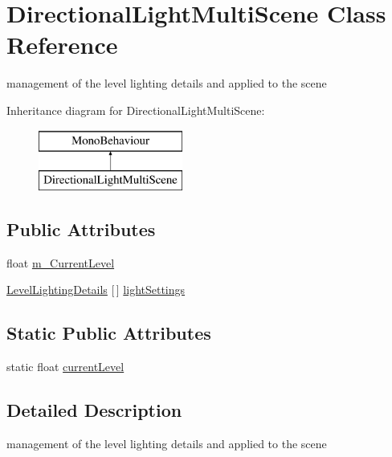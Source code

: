 \hypertarget{class_directional_light_multi_scene}{}\section{Directional\+Light\+Multi\+Scene Class Reference}
\label{class_directional_light_multi_scene}


management of the level lighting details and applied to the scene  


Inheritance diagram for Directional\+Light\+Multi\+Scene\+:\begin{figure}[H]
\begin{center}
\leavevmode
\includegraphics[height=2.000000cm]{class_directional_light_multi_scene}
\end{center}
\end{figure}
\subsection*{Public Attributes}
\begin{DoxyCompactItemize}
\item 
float \mbox{\hyperlink{class_directional_light_multi_scene_af1dd01c4a08f7826fd544f9c8cfc8156}{m\+\_\+\+Current\+Level}}
\item 
\mbox{\hyperlink{class_level_lighting_details}{Level\+Lighting\+Details}} \mbox{[}$\,$\mbox{]} \mbox{\hyperlink{class_directional_light_multi_scene_a9db6db1c8c70152e3333e75a85e8d652}{light\+Settings}}
\end{DoxyCompactItemize}
\subsection*{Static Public Attributes}
\begin{DoxyCompactItemize}
\item 
static float \mbox{\hyperlink{class_directional_light_multi_scene_a850914d4895cb8bc573891a477cb174b}{current\+Level}}
\end{DoxyCompactItemize}


\subsection{Detailed Description}
management of the level lighting details and applied to the scene 



